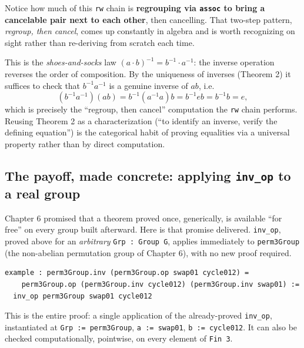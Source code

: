 Notice how much of this \texttt{rw} chain is \textbf{regrouping via \texttt{assoc} to bring a cancelable pair next to each other}, then cancelling. That two-step pattern, \emph{regroup, then cancel}, comes up constantly in algebra and is worth recognizing on sight rather than re-deriving from scratch each time.

\begin{mathreading}

This is the \emph{shoes-and-socks} law \((a\cdot b)^{-1} = b^{-1}\cdot a^{-1}\): the inverse operation reverses the order of composition. By the uniqueness of inverses (Theorem 2) it suffices to check that \(b^{-1}a^{-1}\) is a genuine inverse of \(ab\), i.e. \[
(b^{-1}a^{-1})(ab) = b^{-1}(a^{-1}a)b = b^{-1}eb = b^{-1}b = e,
\] which is precisely the ``regroup, then cancel'' computation the \texttt{rw} chain performs. Reusing Theorem 2 as a characterization (``to identify an inverse, verify the defining equation'') is the categorical habit of proving equalities via a universal property rather than by direct computation.

\end{mathreading}

\subsection{\texorpdfstring{The payoff, made concrete: applying \texttt{inv\_op} to a real group}{The payoff, made concrete: applying inv\_op to a real group}}\label{sec:07-group-theorems:04-theorem-3:2}

Chapter 6 promised that a theorem proved once, generically, is available ``for free'' on every group built afterward. Here is that promise delivered. \texttt{inv\_\allowbreak{}op}, proved above for an \emph{arbitrary} \texttt{Grp : Group G}, applies immediately to \texttt{perm3Group} (the non-abelian permutation group of Chapter 6), with no new proof required.

\begin{lstlisting}
example : perm3Group.inv (perm3Group.op swap01 cycle012) =
    perm3Group.op (perm3Group.inv cycle012) (perm3Group.inv swap01) :=
  inv_op perm3Group swap01 cycle012
\end{lstlisting}

This is the entire proof: a single application of the already-proved \texttt{inv\_\allowbreak{}op}, instantiated at \texttt{Grp := perm3Group}, \texttt{a := swap01}, \texttt{b := cycle012}. It can also be checked computationally, pointwise, on every element of \texttt{Fin 3}.

